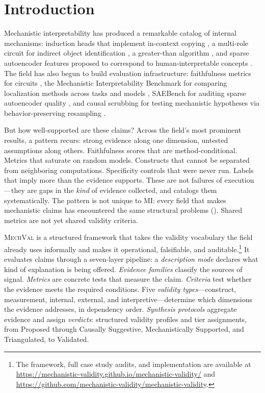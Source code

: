 \documentclass{article}
\newcommand{\mechval}{\textsc{MechVal}}
\begin{document}
\section{Introduction}
\label{sec:intro}

Mechanistic interpretability has produced a remarkable catalog of internal mechanisms:
induction heads that implement in-context copying \citep{olsson2022context}, a multi-role
circuit for indirect object identification \citep{wang2023interpretability}, a greater-than
algorithm \citep{hanna2023greater}, and sparse autoencoder features proposed to correspond
to human-interpretable concepts \citep{cunningham2023sparse, bricken2024monosemanticity}. The field has also begun to
build evaluation infrastructure: faithfulness metrics for circuits
\citep{miller2024transformer}, the Mechanistic Interpretability Benchmark for comparing
localization methods across tasks and models \citep{mueller2025mib}, SAEBench for auditing
sparse autoencoder quality \citep{karvonen2025saebench}, and causal scrubbing for testing
mechanistic hypotheses via behavior-preserving resampling \citep{chan2022causal}.

But how well-supported are these claims? Across the field's most prominent results, a pattern recurs: strong evidence along one dimension, untested assumptions along others. Faithfulness scores that are method-conditional. Metrics that saturate on random models. Constructs that cannot be separated from neighboring computations. Specificity controls that were never run. Labels that imply more than the evidence supports. These are not failures of execution---they are gaps in the \emph{kind} of evidence collected, and  catalogs them systematically. The pattern is not unique to MI: every field that makes mechanistic claims has encountered the same structural problems (). Shared metrics are not yet shared validity criteria.

\mechval{} is a structured framework that takes the validity vocabulary the field already uses informally and makes it operational, falsifiable, and auditable.\footnote{The framework, full case study audits, and implementation are available at \url{https://mechanistic-validity.github.io/mechanistic-validity/} and \url{https://github.com/mechanistic-validity/mechanistic-validity}.} It evaluates claims through a seven-layer pipeline: a \emph{description mode} declares what kind of explanation is being offered. \emph{Evidence families} classify the sources of signal. \emph{Metrics} are concrete tests that measure the claim. \emph{Criteria} test whether the evidence meets the required conditions. Five \emph{validity types}---construct, measurement, internal, external, and interpretive---determine which dimensions the evidence addresses, in dependency order. \emph{Synthesis protocols} aggregate evidence and assign \emph{verdicts}: structured validity profiles and tier assignments, from Proposed through Causally Suggestive, Mechanistically Supported, and Triangulated, to Validated.
\end{document}
